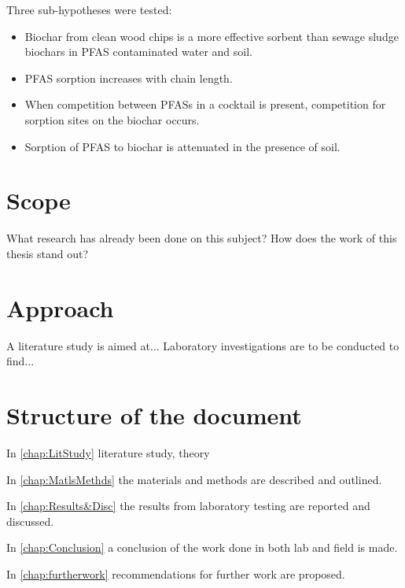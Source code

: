 \textit{}

Three sub-hypotheses were tested:
\begin{itemize}
    \item Biochar from clean wood chips is a more effective sorbent than sewage sludge biochars in PFAS contaminated water and soil.
    \item PFAS sorption increases with chain length.
    \item When competition between PFASs in a cocktail is present, competition for sorption sites on the biochar occurs.
    \item Sorption of PFAS to biochar is attenuated in the presence of soil. 
\end{itemize}
\section{Scope} 
What research has already been done on this subject? How does the work of this thesis stand out?
\section{Approach}
A literature study is aimed at...
Laboratory investigations are to be conducted to find... 

\section{Structure of the document}
In \cref{chap:LitStudy} literature study, theory

In \cref{chap:MatlsMethds} the materials and methods are described and outlined.

In \cref{chap:Results&Disc} the results from laboratory testing are reported and discussed.

In \cref{chap:Conclusion} a conclusion of the work done in both lab and field is made.

In \cref{chap:furtherwork} recommendations for further work are proposed.